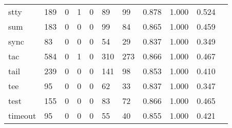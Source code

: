 \begin{longtable}{lp{1.10cm}p{1.10cm}p{1.10cm}p{1.10cm}p{1.10cm}p{1.10cm}p{1.10cm}p{1.10cm}p{1.10cm}p{1.10cm}}
stty      &                    189 &                                  0 &                                 1 &                                0 &                                89 &                              99 &                          0.878 &                                 1.000 &                               0.524 \\
sum       &                    183 &                                  0 &                                 0 &                                0 &                                99 &                              84 &                          0.865 &                                 1.000 &                               0.459 \\
sync      &                     83 &                                  0 &                                 0 &                                0 &                                54 &                              29 &                          0.837 &                                 1.000 &                               0.349 \\
tac       &                    584 &                                  0 &                                 1 &                                0 &                               310 &                             273 &                          0.866 &                                 1.000 &                               0.467 \\
tail      &                    239 &                                  0 &                                 0 &                                0 &                               141 &                              98 &                          0.853 &                                 1.000 &                               0.410 \\
tee       &                     95 &                                  0 &                                 0 &                                0 &                                62 &                              33 &                          0.837 &                                 1.000 &                               0.347 \\
test      &                    155 &                                  0 &                                 0 &                                0 &                                83 &                              72 &                          0.866 &                                 1.000 &                               0.465 \\
timeout   &                     95 &                                  0 &                                 0 &                                0 &                                55 &                              40 &                          0.855 &                                 1.000 &                               0.421 \\

\end{longtable}
